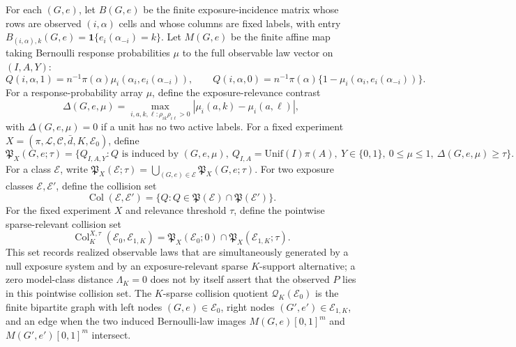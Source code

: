 \documentclass[11pt]{article}
\newcommand{\one}{\mathbf{1}}
\theoremstyle{definition}
\theoremstyle{plain}
\theoremstyle{remark}
\begin{document}
For each \((G,e)\), let \(B(G,e)\) be the finite exposure-incidence matrix whose rows are observed \((i,\alpha)\) cells and whose columns are fixed labels, with entry \(B_{(i,\alpha),k}(G,e)=\one\{e_i(\alpha_{-i})=k\}\).  Let \(M(G,e)\) be the finite affine map taking Bernoulli response probabilities \(\mu\) to the full observable law vector on \((I,A,Y)\):
\[
Q(i,\alpha,1)=n^{-1}\pi(\alpha)\mu_i(\alpha_i,e_i(\alpha_{-i})),\qquad
Q(i,\alpha,0)=n^{-1}\pi(\alpha)\{1-\mu_i(\alpha_i,e_i(\alpha_{-i}))\}.
\]
For a response-probability array \(\mu\), define the exposure-relevance contrast
\[
\Delta(G,e,\mu)=
\max_{i,a,k,\ell:\rho_{ik}\rho_{i\ell}>0}
\left|\mu_i(a,k)-\mu_i(a,\ell)\right|,
\]
with \(\Delta(G,e,\mu)=0\) if a unit has no two active labels.  For a fixed experiment \(X=(\pi,\mathcal L,\mathcal C,\bar d,K,\mathcal E_0)\), define
\[
\mathfrak P_{X}(G,e;\tau)=
\{Q_{I,A,Y}:Q\text{ is induced by }(G,e,\mu),\ Q_{I,A}= \text{Unif}(I)\pi(A),\
Y\in\{0,1\},\ 0\le\mu\le1,\ \Delta(G,e,\mu)\ge\tau\}.
\]
For a class \(\mathcal E\), write \(\mathfrak P_X(\mathcal E;\tau)=\bigcup_{(G,e)\in\mathcal E}\mathfrak P_X(G,e;\tau)\).  For two exposure classes \(\mathcal E,\mathcal E'\), define the collision set
\[
\operatorname{Col}(\mathcal E,\mathcal E')=
\{Q:Q\in\mathfrak P(\mathcal E)\cap\mathfrak P(\mathcal E')\}.
\]
For the fixed experiment \(X\) and relevance threshold \(\tau\), define the pointwise sparse-relevant collision set
\[
\operatorname{Col}_{K}^{X,\tau}(\mathcal E_0,\mathcal E_{1,K})=
\mathfrak P_X(\mathcal E_0;0)\cap \mathfrak P_X(\mathcal E_{1,K};\tau).
\]
This set records realized observable laws that are simultaneously generated by a null exposure system and by an exposure-relevant sparse \(K\)-support alternative; a zero model-class distance \(\Lambda_K=0\) does not by itself assert that the observed \(P\) lies in this pointwise collision set.
The \(K\)-sparse collision quotient \(\mathcal Q_K(\mathcal E_0)\) is the finite bipartite graph with left nodes \((G,e)\in\mathcal E_0\), right nodes \((G',e')\in\mathcal E_{1,K}\), and an edge when the two induced Bernoulli-law images \(M(G,e)[0,1]^m\) and \(M(G',e')[0,1]^m\) intersect.
\end{document}
